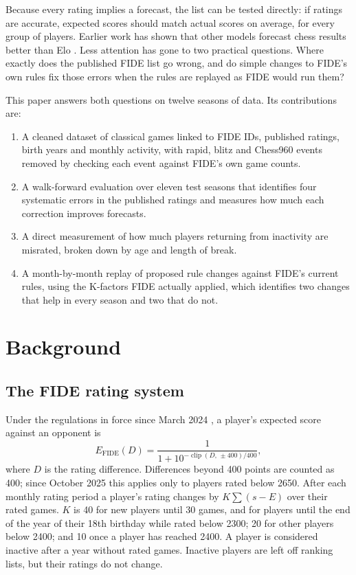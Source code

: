 \documentclass[11pt]{article}
\newcommand{\clip}{\operatorname{clip}}
\begin{document}
Because every rating implies a forecast, the list can be tested directly: if ratings are accurate, expected scores should match actual scores on average, for every group of players. Earlier work has shown that other models forecast chess results better than Elo \citep{sonas2002,glickman1999,sismanis2010,dangauthier2008,coulom2008}. Less attention has gone to two practical questions. Where exactly does the published FIDE list go wrong, and do simple changes to FIDE's own rules fix those errors when the rules are replayed as FIDE would run them?

This paper answers both questions on twelve seasons of data. Its contributions are:
\begin{enumerate}
  \item A cleaned dataset of \NGames{} classical games linked to FIDE IDs, published ratings, birth years and monthly activity, with rapid, blitz and Chess960 events removed by checking each event against FIDE's own game counts.
  \item A walk-forward evaluation over eleven test seasons that identifies four systematic errors in the published ratings and measures how much each correction improves forecasts.
  \item A direct measurement of how much players returning from inactivity are misrated, broken down by age and length of break.
  \item A month-by-month replay of proposed rule changes against FIDE's current rules, using the K-factors FIDE actually applied, which identifies two changes that help in every season and two that do not.
\end{enumerate}

\section{Background}

\subsection{The FIDE rating system}

Under the regulations in force since March 2024 \citep{fide2024}, a player's expected score against an opponent is
\begin{equation}
E_{\mathrm{FIDE}}(D) = \frac{1}{1 + 10^{-\clip(D,\,\pm 400)/400}},
\label{eq:fide}
\end{equation}
where $D$ is the rating difference. Differences beyond 400 points are counted as 400; since October 2025 this applies only to players rated below 2650. After each monthly rating period a player's rating changes by $K \sum (s - E)$ over their rated games. $K$ is 40 for new players until 30 games, and for players until the end of the year of their 18th birthday while rated below 2300; 20 for other players below 2400; and 10 once a player has reached 2400. A player is considered inactive after a year without rated games. Inactive players are left off ranking lists, but their ratings do not change.
\end{document}
